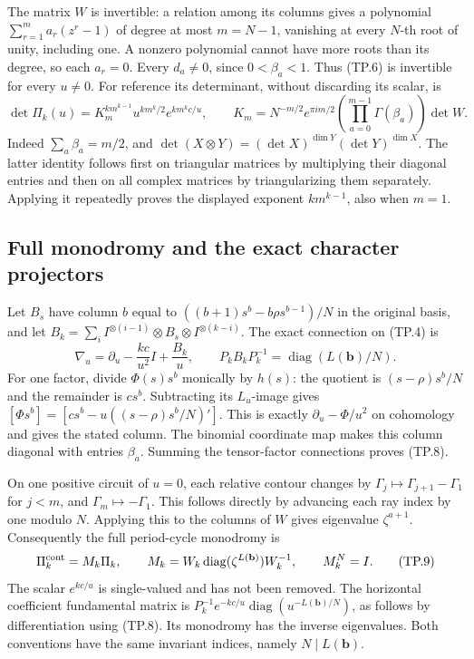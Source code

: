 The matrix \(W\) is invertible: a relation among its columns gives
a polynomial \(\sum_{r=1}^{m}a_r(z^r-1)\) of degree at most
\(m=N-1\), vanishing at every \(N\)-th root of unity, including
one. A nonzero polynomial cannot have more roots than its degree,
so each \(a_r=0\). Every \(d_a\ne0\), since \(0<\beta_a<1\).
Thus (TP.6) is invertible for every \(u\ne0\). For reference its
determinant, without discarding its scalar, is
\[
 \det\Pi_k(u)=K_m^{k m^{k-1}}
       u^{k m^k/2}e^{k m^k c/u},\qquad
 K_m=N^{-m/2}e^{\pi i m/2}
       \left(\prod_{a=0}^{m-1}\Gamma(\beta_a)\right)\det W.
 \tag{TP.7}\label{eq:tp-determinant}
\]
Indeed \(\sum_a\beta_a=m/2\), and
\(\det(X\otimes Y)=(\det X)^{\dim Y}(\det Y)^{\dim X}\).
The latter identity follows first on triangular matrices by
multiplying their diagonal entries and then on all complex matrices
by triangularizing them separately. Applying it repeatedly proves
the displayed exponent \(k m^{k-1}\), also when \(m=1\).

\subsection{Full monodromy and the exact character projectors}

Let \(B_s\) have column \(b\) equal to
\(((b+1)s^b-b\rho s^{b-1})/N\) in the original basis, and let
\(B_k=\sum_i I^{\otimes(i-1)}\otimes B_s\otimes I^{\otimes(k-i)}\).
The exact connection on (TP.4) is
\[
 \nabla_u=\partial_u-\frac{kc}{u^2}I+\frac{B_k}{u},
 \qquad P_kB_kP_k^{-1}
         =\operatorname{diag}(L(\mathbf b)/N).
 \tag{TP.8}\label{eq:tp-connection}
\]
For one factor, divide \(\Phi(s)s^b\) monically by \(h(s)\):
the quotient is \((s-\rho)s^b/N\) and the remainder is \(cs^b\).
Subtracting its \(L_u\)-image gives
\([\Phi s^b]=[cs^b-u((s-\rho)s^b/N)']\).
This is exactly \(\partial_u-\Phi/u^2\) on cohomology and gives
the stated column. The binomial coordinate map makes this column
diagonal with entries \(\beta_a\). Summing the tensor-factor
connections proves (TP.8).

On one positive circuit of \(u=0\), each relative contour changes
by \(\Gamma_j\mapsto\Gamma_{j+1}-\Gamma_1\) for \(j<m\), and
\(\Gamma_m\mapsto-\Gamma_1\). This follows directly by advancing
each ray index by one modulo \(N\). Applying this to the columns
of \(W\) gives eigenvalue \(\zeta^{a+1}\).
Consequently the full period-cycle monodromy is
\[
 \Pi_k^{\rm cont}=M_k\Pi_k,\qquad
 M_k=W_k\operatorname{diag}(\zeta^{L(\mathbf b)})W_k^{-1},
 \qquad M_k^N=I.
 \tag{TP.9}\label{eq:tp-monodromy}
\]
The scalar \(e^{kc/u}\) is single-valued and has not been removed.
The horizontal coefficient fundamental matrix is
\(P_k^{-1}e^{-kc/u}\operatorname{diag}(u^{-L(\mathbf b)/N})\),
as follows by differentiation using (TP.8). Its monodromy has the
inverse eigenvalues. Both conventions have the same invariant
indices, namely \(N\mid L(\mathbf b)\).

